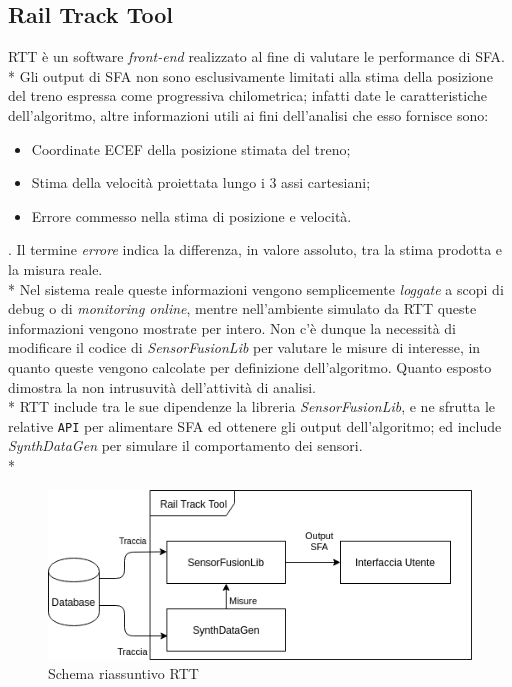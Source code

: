 \subsection{Rail Track Tool}
RTT \`e un software \emph{front-end} realizzato al fine di valutare le performance di SFA.\\*
Gli output di SFA non sono esclusivamente limitati alla stima della posizione del treno espressa come progressiva chilometrica; infatti date le caratteristiche dell'algoritmo, altre informazioni utili ai fini dell'analisi che esso fornisce sono:
\begin{itemize}
	\item Coordinate ECEF della posizione stimata del treno;
	\item Stima della velocit\`a proiettata lungo i 3 assi cartesiani;
	\item Errore commesso nella stima di posizione e velocit\`a.
\end{itemize}.
Il termine \emph{errore} indica la differenza, in valore assoluto, tra la stima prodotta e la misura reale.\\*
Nel sistema reale queste informazioni vengono semplicemente \emph{loggate} a scopi di debug o di \emph{monitoring online}, mentre nell'ambiente simulato da RTT queste informazioni vengono mostrate per intero. Non c'\`e dunque la necessit\`a di modificare il codice di \emph{SensorFusionLib} per valutare le misure di interesse, in quanto queste vengono calcolate per definizione dell'algoritmo. Quanto esposto dimostra la non intrusuvit\`a dell'attivit\`a di analisi.\\*
RTT include tra le sue dipendenze la libreria \emph{SensorFusionLib}, e ne sfrutta le relative \texttt{API} per alimentare SFA ed ottenere gli output dell'algoritmo; ed include \emph{SynthDataGen} per simulare il comportamento dei sensori.\\*
\begin{figure}[h]
	\centering
	\includegraphics[width=0.7\linewidth]{img/RTTSchemaFull}
	\caption{Schema riassuntivo RTT}
	\label{fig:rttfull}
\end{figure}
